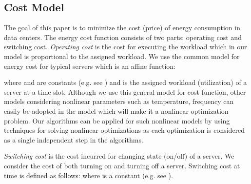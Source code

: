 \documentclass[10pt,conference,compsocconf,letterpaper]{IEEEtran}
\begin{document}
\subsection{Cost Model}
The goal of this paper is to minimize the cost (price) of energy consumption in data centers. The energy cost function consists of two parts: operating cost and switching cost. {\it Operating cost} is the cost for executing the workload which in our model is proportional to the assigned workload. We use the common model for energy cost for typical servers which is an affine function:

where  and  are constants (e.g. see \cite{20}) and  is the assigned workload (utilization) of a server at a time slot. Although we use this general model for cost function, other models considering nonlinear parameters such as temperature, frequency can easily be adopted in the model which will make it a nonlinear optimization problem. Our algorithms can be applied for such nonlinear models by using techniques for solving nonlinear optimizations as each optimization is considered as a single independent step in the algorithms.





{\it Switching cost } is the cost incurred for changing state (on/off) of a server. We consider the cost of both turning on and turning off a server. Switching cost at time  is defined as follows:  where  is a constant (e.g. see \cite{9,21}).
\end{document}
